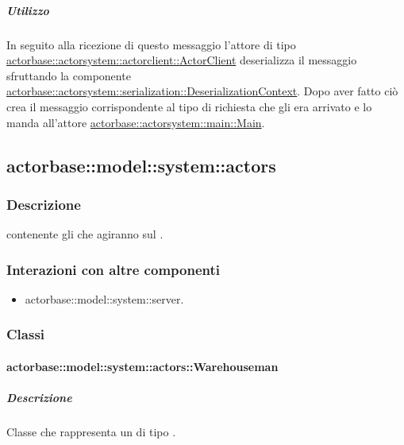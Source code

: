 \documentclass{scalatekids-article}
\begin{document}
\subparagraph{Utilizzo}

In seguito alla ricezione di questo messaggio l'attore di tipo
\hyperref[sec:actorbase::actorsystem::actorclient::ActorClient]{actorbase::actorsystem::actorclient::ActorClient}
deserializza il messaggio sfruttando la componente
\hyperref[sec:actorbase::actorsystem::serialization::DeserializationContext]{actorbase::actorsystem::serialization::DeserializationContext}.
Dopo aver fatto ciò crea il messaggio corrispondente al tipo di richiesta che gli era arrivato
e lo manda all'attore \hyperref[sec:actorbase::actorsystem::main::Main]{actorbase::actorsystem::main::Main}.

\subsection{actorbase::model::system::actors}

\subsubsection{Descrizione}

 contenente gli  che agiranno sul .

\subsubsection{Interazioni con altre componenti}

\begin{itemize}
\item actorbase::model::system::server.
\end{itemize}

\subsubsection{Classi}

\paragraph{actorbase::model::system::actors::Warehouseman}

\subparagraph{Descrizione}

Classe che rappresenta un  di tipo .
\end{document}
